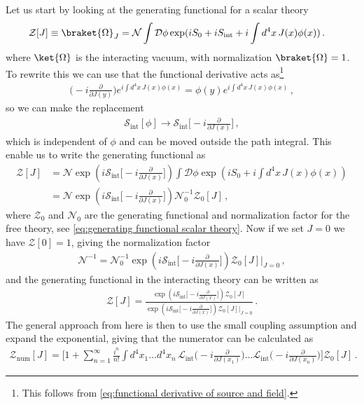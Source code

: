 Let us start by looking at the generating functional for a scalar theory
\begin{align}
    \mathcal{Z}[J]&\equiv\braket{\Omega}_{J}=\mathcal{N}\int\mathcal{D}\phi\exp(iS_{0}+iS_{\text{int}}+i\int d^{4}x\,J(x)\phi(x))\,.
\end{align}
where $\ket{\Omega}$ is the interacting vacuum, with normalization $\braket{\Omega}=1$. To rewrite this we can use that the functional derivative acts as\footnote{This follows from \cref{eq:functional derivative of source and field}.}
\begin{align}
    \Big(-i\frac{\partial}{\partial J(y)}\Big)e^{i\int d^{4}x\,J(x)\phi(x)}=\phi(y)e^{i\int d^{4}x\,J(x)\phi(x)}\,,
\end{align}
so we can make the replacement
\begin{align}
    \mathcal{S}_{\text{int}}[\phi]\rightarrow \mathcal{S}_{\text{int}}\Big[-i\frac{\partial}{\partial J(x)}\Big]\,,
\end{align}
which is independent of $\phi$ and can be moved outside the path integral. This enable us to write the generating functional as
\begin{align}
    \mathcal{Z}[J]&=\mathcal{N}\exp(i\mathcal{S}_{\text{int}}\Big[-i\frac{\partial}{\partial J(x)}\Big])\int\mathcal{D}\phi\exp(iS_{0}+i\int d^{4}x\,J(x)\phi(x))\nonumber
    \\
    &=\mathcal{N}\exp(i\mathcal{S}_{\text{int}}\Big[-i\frac{\partial}{\partial J(x)}\Big])\mathcal{N}_{0}^{-1}\mathcal{Z}_{0}[J]\,,
\end{align}
where $\mathcal{Z}_{0}$ and $\mathcal{N}_{0}$ are the generating functional and normalization factor for the free theory, see \cref{eq:generating functional scalar theory}. Now if we set $J=0$ we have $\mathcal{Z}[0]=1$, giving the normalization factor
\begin{align}
    \mathcal{N}^{-1}=\mathcal{N}_{0}^{-1}\exp(i\mathcal{S}_{\text{int}}\Big[-i\frac{\partial}{\partial J(x)}\Big])\mathcal{Z}_{0}[J]\Big|_{J=0}\,,
\end{align}
and the generating functional in the interacting theory can be written as
\begin{align}
    \mathcal{Z}[J]=\frac{\exp(i\mathcal{S}_{\text{int}}\Big[-i\frac{\partial}{\partial J(x)}\Big])\mathcal{Z}_{0}[J]}{\exp(i\mathcal{S}_{\text{int}}\Big[-i\frac{\partial}{\partial J(x)}\Big])\mathcal{Z}_{0}[J]\Big|_{J=0}}\,.
\end{align}
The general approach from here is then to use the small coupling assumption and expand the exponential, giving that the numerator can be calculated as
\begin{align}\label{eq:interacting functional expanded}
    \mathcal{Z}_{\text{num}}[J]=\Big[1+\sum_{n=1}^{\infty}\frac{i^{n}}{n!}\int d^{4}x_{1}\dots d^{4}x_{n}\,\mathcal{L}_{\text{int}}\Big(-i\frac{\partial}{\partial J(x_1)}\Big)\dots \mathcal{L}_{\text{int}}\Big(-i\frac{\partial}{\partial J(x_n)}\Big)\Big]\mathcal{Z}_{0}[J]\,.
\end{align}

